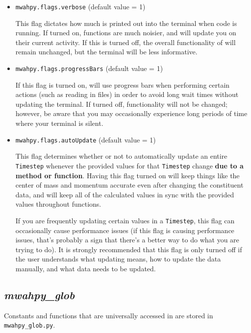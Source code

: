 \documentclass{article}
\begin{document}
\begin{itemize}

\item \verb!mwahpy.flags.verbose! (default value = 1)

This flag dictates how much is printed out into the terminal when \mwahpy code is running. If turned on, functions are much noisier, and will update you on their current activity. If this is turned off, the overall functionality of \mwahpy will remain unchanged, but the terminal will be less informative. 

\item \verb!mwahpy.flags.progressBars! (default value = 1)

If this flag is turned on, \mwahpy will use progress bars when performing certain actions (such as reading in files) in order to avoid long wait times without updating the terminal. If turned off, \mwahpy functionality will not be changed; however, be aware that you may occasionally experience long periods of time where your terminal is silent.

\item \verb!mwahpy.flags.autoUpdate! (default value = 1)

This flag determines whether or not to automatically update an entire \verb!Timestep! whenever the provided values for that \verb!Timestep! change \textbf{due to a \mwahpy method or function}. Having this flag turned on will keep things like the center of mass and momentum accurate even after changing the constituent data, and will keep all of the calculated values in sync with the provided values throughout \mwahpy functions. 

If you are frequently updating certain values in a \verb!Timestep!, this flag can occasionally cause performance issues (if this flag is causing performance issues, that's probably a sign that there's a better way to do what you are trying to do). It is strongly recommended that this flag is only turned off if the user understands what updating means, how to update the data manually, and what data needs to be updated. 

\end{itemize}

\subsection{\textit{mwahpy\_glob}}

Constants and functions that are universally accessed in \mwahpy are stored in \verb!mwahpy_glob.py!. 
\end{document}
